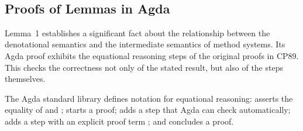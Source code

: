 \begin{AgdaAlign}
\begin{code}[hide]
\\
%
\>[4]\<%
\\
%
\>[4]\<%
\\
%
\>[4]\<%
\\
%
\>[4]\<%
\\
%
\>[4]\<%
\\
\>[0]\<%
\end{code}

\subsection{Proofs of Lemmas in Agda}

Lemma~1 establishes a significant fact about the relationship
between the denotational semantics and the intermediate semantics of method systems.
Its Agda proof exhibits the equational reasoning steps of the original proofs in CP89.
This checks the correctness not only of the stated result, but also of the steps themselves.

The Agda standard library defines notation for equational reasoning:
 asserts the equality of  and ;
 starts a proof;
 adds a step that Agda can check automatically;
 adds a step with an explicit proof term ;
and  concludes a proof.


\end{AgdaAlign}
